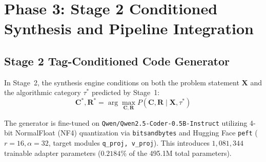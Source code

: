 \documentclass[lettersize,journal]{IEEEtran}
\begin{document}
\begin{table}[!h]
\caption{Stage~1 Classifier Performance on Unseen Test Problems}
\label{tab:classifier_metrics}
\centering
{}
\end{table}

\section{Phase 3: Stage 2 Conditioned Synthesis and Pipeline Integration}
\subsection{Stage 2 Tag-Conditioned Code Generator}
In Stage~2, the synthesis engine conditions on both the problem statement $\mathbf{X}$ and the algorithmic category $\tau^*$ predicted by Stage~1:
\begin{equation}
\mathbf{C}^*, \mathbf{R}^* = \arg\max_{\mathbf{C}, \mathbf{R}} P(\mathbf{C}, \mathbf{R} \mid \mathbf{X}, \tau^*)
\end{equation}

The generator is fine-tuned on \texttt{Qwen/Qwen2.5-Coder-0.5B-Instruct} utilizing 4-bit NormalFloat (NF4) quantization via \texttt{bitsandbytes} and Hugging Face \texttt{peft} ($r=16, \alpha=32$, target modules \texttt{q\_proj, v\_proj}). This introduces $1,081,344$ trainable adapter parameters ($0.2184\%$ of the 495.1M total parameters). 
\end{document}
